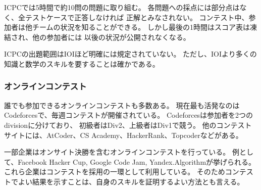 ICPCでは5時間で約10問の問題に取り組む。
各問題への採点には部分点はなく、全テストケースで正答しなければ
正解とみなされない。
コンテスト中、参加者は他チームの状況を知ることができる。
しかし最後の1時間はスコア表は凍結され、他の参加者には
以後の状況が公開されなくなる。

ICPCの出題範囲はIOIほど明確には規定されていない。
ただし、IOIより多くの知識と数学のスキルを要することは確かである。

\begin{comment}
\subsubsection{Online contests}

There are also many online contests that are open for everybody.
At the moment, the most active contest site is Codeforces,
which organizes contests about weekly.
In Codeforces, participants are divided into two divisions:
beginners compete in Div2 and more experienced programmers in Div1.
Other contest sites include AtCoder, CS Academy, HackerRank and Topcoder.

Some companies organize online contests with onsite finals.
Examples of such contests are Facebook Hacker Cup,
Google Code Jam and Yandex.Algorithm.
Of course, companies also use those contests for recruiting:
performing well in a contest is a good way to prove one's skills.
\end{comment}

\subsubsection{オンラインコンテスト}

誰でも参加できるオンラインコンテストも多数ある。
現在最も活発なのはCodeforcesで、毎週コンテストが開催されている。
Codeforcesは参加者を2つのdivisionに分けており、
初級者はDiv2、上級者はDiv1で競う。
他のコンテストサイトには、AtCoder、CS Academy、HackerRank、Topcoderなどがある。

一部企業はオンサイト決勝を含むオンラインコンテストを行っている。
例として、Facebook Hacker Cup, Google Code Jam, Yandex.Algorithmが挙げられる。
これら企業はコンテストを採用の一環として利用している。
そのためコンテストでよい結果を示すことは、自身のスキルを証明するよい方法とも言える。


\begin{comment}
\subsubsection{Books}

There are already some books (besides this book) that
focus on competitive programming and algorithmic problem solving:
\end{comment}


